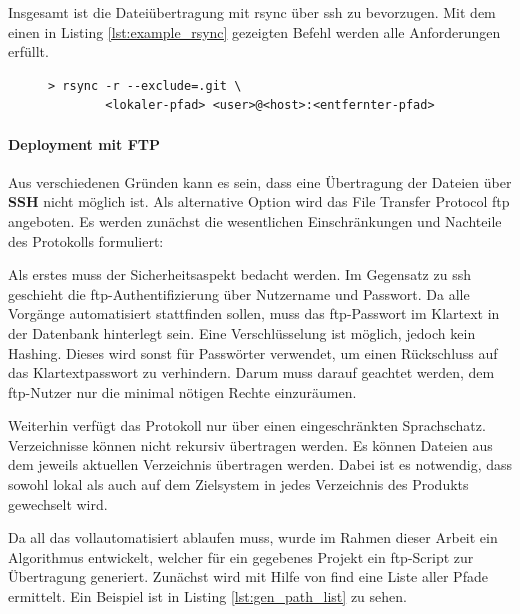 Insgesamt ist die Dateiübertragung mit rsync über \gls{ssh} zu bevorzugen. Mit dem einen in Listing \ref{lst:example_rsync} gezeigten Befehl werden alle Anforderungen erfüllt.

\begin{figure}
	\begin{lstlisting}[caption=Beispiel rsync Befehl,label={lst:example_rsync}]
	> rsync -r --exclude=.git \
		<lokaler-pfad> <user>@<host>:<entfernter-pfad>
	\end{lstlisting}
\end{figure}


\paragraph{Deployment mit FTP} %
\label{par:deployment_mit_ftp}

Aus verschiedenen Gründen kann es sein, dass eine Übertragung der Dateien über \textbf{SSH} nicht möglich ist. Als alternative Option wird das File Transfer Protocol \gls{ftp} angeboten. Es werden zunächst die wesentlichen Einschränkungen und Nachteile des Protokolls formuliert:

Als erstes muss der Sicherheitsaspekt bedacht werden. Im Gegensatz zu \gls{ssh} geschieht die \gls{ftp}-Authentifizierung über Nutzername und Passwort. Da alle Vorgänge automatisiert stattfinden sollen, muss das \gls{ftp}-Passwort im Klartext in der Datenbank hinterlegt sein. Eine Verschlüsselung ist möglich, jedoch kein Hashing. Dieses wird sonst für Passwörter verwendet, um einen Rückschluss auf das Klartextpasswort zu verhindern. Darum muss darauf geachtet werden, dem \gls{ftp}-Nutzer nur die minimal nötigen Rechte einzuräumen.

Weiterhin verfügt das Protokoll nur über einen eingeschränkten Sprachschatz. Verzeichnisse können nicht rekursiv übertragen werden. Es können Dateien aus dem jeweils aktuellen Verzeichnis übertragen werden. Dabei ist es notwendig, dass sowohl lokal als auch auf dem Zielsystem in jedes Verzeichnis des Produkts gewechselt wird.

Da all das vollautomatisiert ablaufen muss, wurde im Rahmen dieser Arbeit ein Algorithmus entwickelt, welcher für ein gegebenes Projekt ein \gls{ftp}-Script zur Übertragung generiert. Zunächst wird mit Hilfe von find eine Liste aller Pfade ermittelt. Ein Beispiel ist in Listing \ref{lst:gen_path_list} zu sehen.

